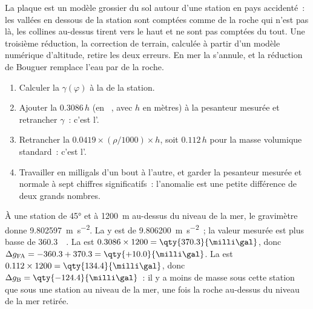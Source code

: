 La plaque est un modèle grossier du sol autour d'une station en pays accidenté~: les
vallées en dessous de la station sont comptées comme de la roche qui n'est pas là,
les collines au-dessus tirent vers le haut et ne sont pas comptées du tout. Une
troisième réduction, la correction de terrain, calculée à partir d'un modèle numérique
d'altitude, retire les deux erreurs. En mer la  s'annule, et
la réduction de Bouguer remplace l'eau par de la roche.

\begin{method}\label{met:b1:isostasy-gravity:reduction}
\begin{enumerate}
  \item Calculer la  $\gamma(\varphi)$ à la  de la station.
  \item Ajouter la  $0.3086\,h$ (en \unit{\milli\gal}, avec $h$
        en mètres) à la pesanteur mesurée et retrancher $\gamma$~: c'est l'.
  \item Retrancher la  $0.0419\times(\rho/1000)\times h$, soit
        $0.112\,h$ pour la masse volumique standard~: c'est l'.
  \item Travailler en milligals d'un bout à l'autre, et garder la pesanteur mesurée et
        normale à sept chiffres significatifs~: l'anomalie est une petite différence
        de deux grands nombres.
\end{enumerate}
\end{method}

\begin{example}\label{ex:b1:isostasy-gravity:reduction}
À une station de  \ang{45} et à \qty{1200}{m} au-dessus du niveau de la mer,
le gravimètre donne \qty{9.802597}{m.s^{-2}}. La  y est de
\qty{9.806200}{m.s^{-2}}~; la valeur mesurée est plus basse de \qty{360.3}{\milli\gal}.
La  est $0.3086\times1200 = \qty{370.3}{\milli\gal}$, donc
$\Delta g_{\mathrm{FA}} = -360.3 + 370.3 = \qty{+10.0}{\milli\gal}$. La  est $0.112\times1200 = \qty{134.4}{\milli\gal}$, donc $\Delta g_{\mathrm B}
= \qty{-124.4}{\milli\gal}$~: il y a moins de masse sous cette station que sous une
station au niveau de la mer, une fois la roche au-dessus du niveau de la mer retirée.
\end{example}

